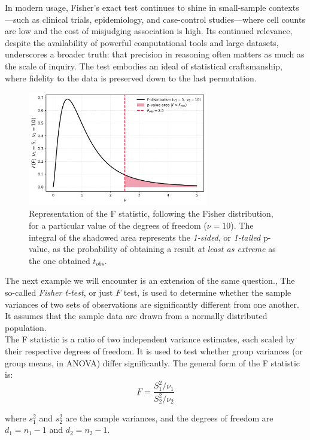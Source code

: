 \documentclass{book}
\begin{document}
In modern usage, Fisher’s exact test continues to shine in small-sample contexts—such as clinical trials, epidemiology, and case-control studies—where cell counts are low and the cost of misjudging association is high. Its continued relevance, despite the availability of powerful computational tools and large datasets, underscores a broader truth: that precision in reasoning often matters as much as the scale of inquiry. The test embodies an ideal of statistical craftsmanship, where fidelity to the data is preserved down to the last permutation.\\

\begin{figure}[ht]
    \centering
    \includegraphics[width=0.7\textwidth]{figures/chapter4/f_test_one_tailed.png}
    \caption{Representation of the F statistic, following the Fisher distribution, for a particular value of the degrees of freedom ($\nu = 10$). The integral of the shadowed area represents the \textit{1-sided}, or \textit{1-tailed} p-value, as the probability of obtaining a result \textit{at least as extreme} as the one obtained $t_{obs}$.}
    \label{fig:f_test1}
\end{figure}

The next example we will encounter is an extension of the same question., The so-called \textit{Fisher t-test}, or just $F$ test, is used to determine whether the sample variances of two sets of observations are significantly different from one another. It assumes that the sample data are drawn from a normally distributed population.\\

The F statistic is a ratio of two independent variance estimates, each scaled by their respective degrees of freedom. It is used to test whether group variances (or group means, in ANOVA) differ significantly. The general form of the F statistic is:
\[
F = \frac{S_1^2 / \nu_1}{S_2^2 / \nu_2}
\]

where $s_1^{2}$ and $s_2^{2}$ are the sample variances, and the degrees of freedom are $d_1 = n_1 - 1$ and $d_2 = n_2 - 1$.\\
\end{document}
